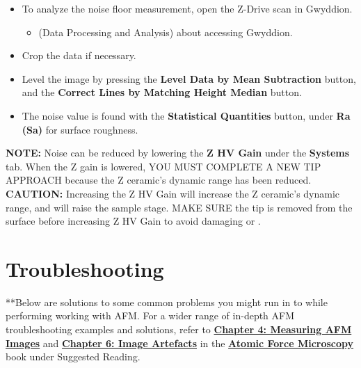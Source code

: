 \documentclass{../lab}
\begin{document}
{\begin{itemize}
        \begin{itemize}
            \item 50 scan lines is plenty.

        \end{itemize}

        \item To analyze the noise floor measurement, open the Z-Drive scan in Gwyddion.

        \begin{itemize}
            \item \textbf{} (Data Processing and Analysis) about accessing Gwyddion.

        \end{itemize}

        \item Crop the data if necessary.

        \item Level the image by pressing the \textbf{Level Data by Mean Subtraction} button, and the \textbf{Correct Lines by Matching Height Median} button.

        \item The noise value is found with the\textbf{ Statistical Quantities }button, under \textbf{Ra (Sa)} for surface roughness.

    \end{itemize}

\textbf{NOTE: }Noise can be reduced by lowering the \textbf{Z HV Gain} under the \textbf{Systems} tab.  When the Z gain is lowered, YOU MUST COMPLETE A NEW TIP APPROACH because the Z ceramic’s dynamic range has been reduced.
\textbf{CAUTION: }Increasing the Z HV Gain will increase the Z ceramic’s dynamic range, and will raise the sample stage.  MAKE SURE the tip is removed from the surface before increasing Z HV Gain to avoid damaging or \textbf{}.

\section{Troubleshooting}
\label{sec:troubleshooting}

**Below are solutions to some common problems you might run in to while performing working with AFM.  For a wider range of in-depth AFM troubleshooting examples and solutions, refer to \href{http://experimentationlab.berkeley.edu/afm-book}{\textbf{Chapter 4: Measuring AFM Images}} and \href{http://experimentationlab.berkeley.edu/afm-book}{\textbf{Chapter 6: Image Artefacts}} in the \href{http://experimentationlab.berkeley.edu/afm-book}{\textbf{Atomic Force Microscopy}} book under Suggested Reading.

}
\end{document}
